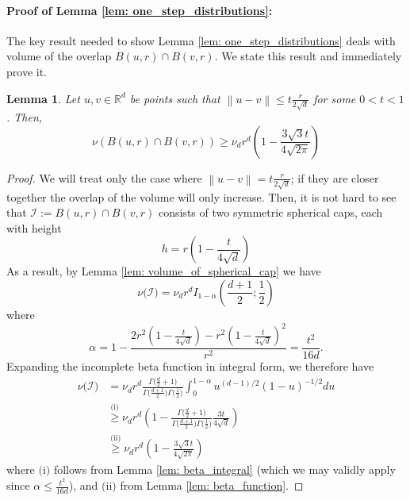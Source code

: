 \documentclass[11pt,twoside]{article}
\newtheorem{lemma}{Lemma}
\newcommand{\Reals}{\mathbb{R}}
\newcommand{\Rd}{\Reals^d}
\newcommand{\norm}[1]{\left\lVert#1\right\rVert}
\newcommand{\1}{\mathbf{1}}
\begin{document}
\paragraph{Proof of Lemma \ref{lem: one_step_distributions}:}

The key result needed to show Lemma \ref{lem: one_step_distributions} deals with volume of the overlap $B(u,r) \cap B(v,r)$. We state this result and immediately prove it.
\begin{lemma}
	\label{lem: overlap_balls_1}
	Let $u,v \in \Rd$ be points such that $\norm{u - v} \leq t\frac{r}{2\sqrt{d}}$ for some $0 < t < 1$. Then,
	\begin{equation*}
	\nu(B(u,r) \cap B(v,r)) \geq \nu_d r^d \left(1 - \frac{3 \sqrt{3} t}{4\sqrt{2\pi}} \right)
	\end{equation*}
\end{lemma}
\begin{proof}
	We will treat only the case where $\norm{u - v} = t\frac{r}{2\sqrt{d}}$; if they are closer together the overlap of the volume will only increase. Then, it is not hard to see that $\mathcal{I} := B(u,r) \cap B(v,r)$ consists of two symmetric spherical caps, each with height
	\begin{equation*}
	h = r\left(1 - \frac{t}{4\sqrt{d}}\right)
	\end{equation*} 
	As a result, by Lemma \ref{lem: volume_of_spherical_cap} we have
	\begin{equation*}
	\nu\bigl(\mathcal{I}\bigr) = \nu_d r^d I_{1 - \alpha}(\frac{d + 1}{2}; \frac{1}{2})
	\end{equation*}
	where
	\begin{equation*}
	\alpha = 1 - \frac{2r^2(1 - \frac{t}{4 \sqrt{d}}) - r^2(1 - \frac{t}{4 \sqrt{d}})^2}{r^2} = \frac{t^2}{16d}.
	\end{equation*}
	Expanding the incomplete beta function in integral form, we therefore have
	\begin{align*}
	\nu\bigl(\mathcal{I}\bigr) & = \nu_d r^d \frac{\Gamma\bigl(\frac{d}{2}+ 1\bigr)}{\Gamma\bigl(\frac{d + 1}{2}\bigr) \Gamma\bigl(\frac{1}{2}\bigr)} \int_{0}^{1 - \alpha}u^{(d-1)/2}(1 - u)^{-1/2}du \\
	& \overset{\text{(i)}}{\geq} \nu_d r^d \left(1 - \frac{\Gamma\bigl(\frac{d}{2}+ 1\bigr)}{\Gamma\bigl(\frac{d + 1}{2}\bigr) \Gamma\bigl(\frac{1}{2}\bigr)} \frac{3 t}{4\sqrt{d}} \right) \\
	& \overset{\text{(ii)}}{\geq} \nu_d r^d \left(1 -  \frac{3 \sqrt{3} t}{4\sqrt{2\pi}} \right)
	\end{align*}
	where $\text{(i)}$ follows from Lemma \ref{lem: beta_integral} (which we may validly apply since $\alpha \leq \frac{t^2}{16d}$), and $\text{(ii)}$ from Lemma \ref{lem: beta_function}.
\end{proof}
\end{document}
